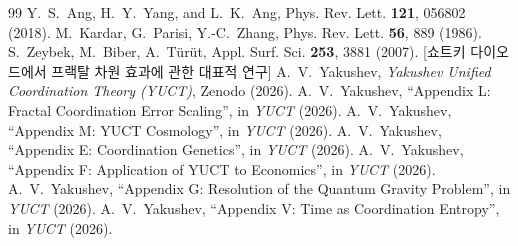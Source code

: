 \documentclass[12pt,a4paper]{article}
\theoremstyle{remark}
\begin{document}
	\begin{thebibliography}{99}
		 Y.~S.~Ang, H.~Y.~Yang, and L.~K.~Ang,
		Phys. Rev. Lett. \textbf{121}, 056802 (2018).
		 M.~Kardar, G.~Parisi, Y.-C.~Zhang,
		Phys. Rev. Lett. \textbf{56}, 889 (1986).
		 S.~Zeybek, M.~Biber, A.~Türüt,
		Appl. Surf. Sci. \textbf{253}, 3881 (2007). [쇼트키 다이오드에서 프랙탈 차원 효과에 관한 대표적 연구]
		 A.~V.~Yakushev, \emph{Yakushev Unified
			Coordination Theory (YUCT)}, Zenodo (2026).
		 A.~V.~Yakushev, ``Appendix L: Fractal
		Coordination Error Scaling'', in \emph{YUCT} (2026).
		 A.~V.~Yakushev, ``Appendix M: YUCT
		Cosmology'', in \emph{YUCT} (2026).
		 A.~V.~Yakushev, ``Appendix E: Coordination
		Genetics'', in \emph{YUCT} (2026).
		 A.~V.~Yakushev, ``Appendix F: Application of
		YUCT to Economics'', in \emph{YUCT} (2026).
		 A.~V.~Yakushev, ``Appendix G: Resolution of
		the Quantum Gravity Problem'', in \emph{YUCT} (2026).
		 A.~V.~Yakushev, ``Appendix V: Time as
		Coordination Entropy'', in \emph{YUCT} (2026).
	\end{thebibliography}
	
\end{document}
